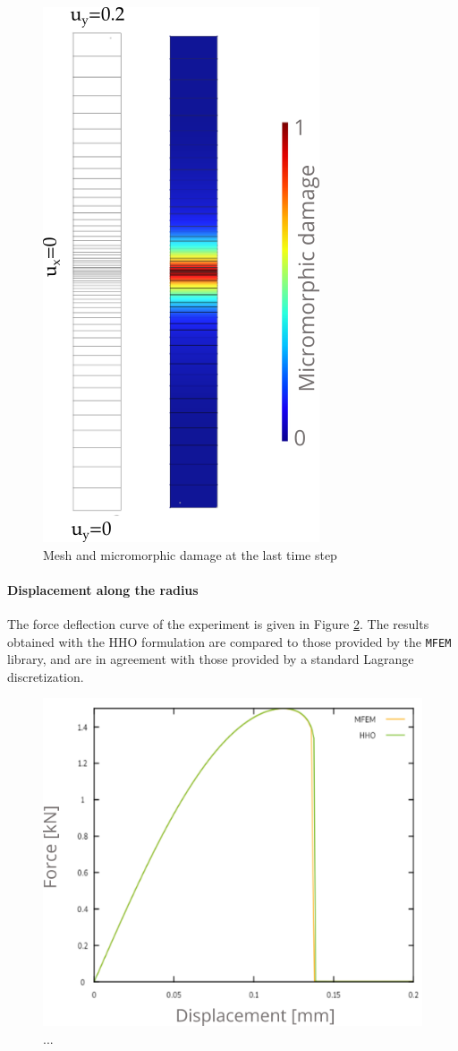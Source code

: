 \begin{figure}[H]
    \centering
    \includegraphics[width=5.cm]{../chapter_004_hho_micromorphic/figures/rod.png}
    \caption{Mesh and micromorphic damage at the last time step}
    \label{fig_rod_micromirphic}
\end{figure}

\paragraph{Displacement along the radius}

The force deflection curve of the experiment is given in Figure \ref{fig_rod_micromirphic_cruve}. The results obtained with the HHO formulation are compared to those provided by
the \texttt{MFEM} library, and are in agreement with those provided by a standard Lagrange discretization.
%
% 
% 
\begin{figure}[H]
    \centering
    \includegraphics[width=7.cm]{../chapter_004_hho_micromorphic/figures/rod_curve.png}
    \caption{...}
    \label{fig_rod_micromirphic_cruve}
\end{figure}

